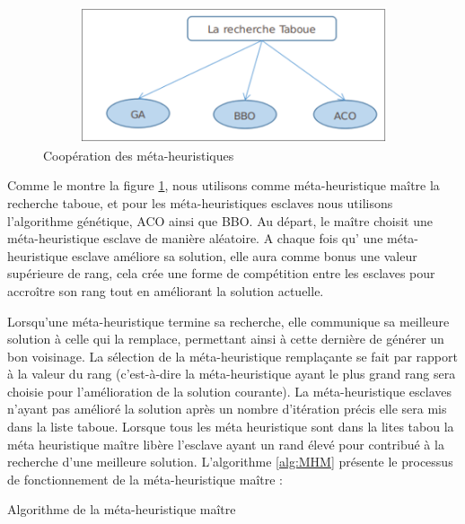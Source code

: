 \begin{figure}[H]
	\centering
	\includegraphics[width=13cm,height=4cm]{Chap4/3.png}
	\caption{Coopération des méta-heuristiques}
	\label{fig:CMH}
\end{figure}


Comme le montre la figure \ref{fig:CMH}, nous utilisons comme méta-heuristique maître la recherche taboue, et pour les méta-heuristiques esclaves nous utilisons l’algorithme génétique, ACO ainsi que BBO. Au départ, le maître choisit une méta-heuristique esclave de manière aléatoire. A chaque fois qu' une méta-heuristique esclave améliore sa solution, elle aura comme bonus une valeur supérieure de rang, cela crée une forme de compétition entre les esclaves pour accroître son rang tout en améliorant la solution actuelle.

Lorsqu'une méta-heuristique termine sa recherche, elle communique sa meilleure solution à celle qui la remplace, permettant ainsi à cette dernière de générer un bon voisinage. La sélection de la méta-heuristique remplaçante se fait par rapport à la valeur du rang (c’est-à-dire la méta-heuristique ayant le plus grand rang sera choisie pour l’amélioration de la solution courante). La méta-heuristique esclaves n’ayant pas amélioré la solution après un   nombre d’itération  précis  elle sera mis dans la liste taboue. Lorsque tous les méta heuristique sont dans la lites tabou la méta heuristique maître libère l’esclave ayant un rand élevé pour contribué à la recherche d’une meilleure solution. L'algorithme \ref{alg:MHM} présente le processus de fonctionnement de la méta-heuristique maître :


\begin{algorithm}[H]
\label{alg:MHM}
\caption{Algorithme de la méta-heuristique maître}
\SetAlgoLined
\DontPrintSemicolon

\end{algorithm}


